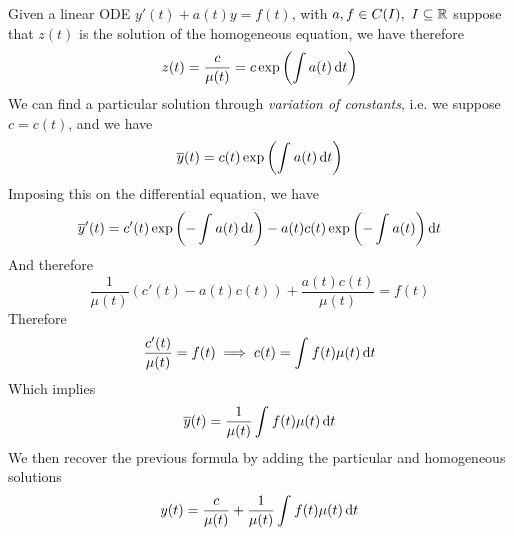 \documentclass[../complete.tex]{subfiles}
\begin{document}
\begin{mtd}
	Given a linear ODE $y'(t)+a(t)y=f(t)$, with $a,f\in C(I),\ I\subseteq\mathbb{R}$ suppose that $z(t)$ is the solution of the homogeneous equation, we have therefore
	\begin{equation*}
		z(t)=\frac{c}{\mu(t)}=c\exp\left( \int a(t)\operatorname{d\!} t \right)
	\end{equation*}
	We can find a particular solution through \textit{variation of constants}, i.e. we suppose $c=c(t)$, and we have
	\begin{equation*}
		\overline{y}(t)=c(t)\exp\left( \int_{}^{}a(t)\operatorname{d\!} t \right)
	\end{equation*}
	Imposing this on the differential equation, we have
	\begin{equation*}
		\overline{y}'(t)=c'(t)\exp\left( -\int_{}^{}a(t)\operatorname{d\!} t \right)-a(t)c(t)\exp\left( -\int_{}^{}a(t) \right)\operatorname{d\!} t
	\end{equation*}
	And therefore
	\begin{equation*}
		\frac{1}{\mu(t)}\left( c'(t)-a(t)c(t) \right)+\frac{a(t)c(t)}{\mu(t)}=f(t)
	\end{equation*}
	Therefore
	\begin{equation*}
		\frac{c'(t)}{\mu(t)}=f(t)\implies{} c(t)=\int_{}^{}f(t)\mu(t)\operatorname{d\!} t
	\end{equation*}
	Which implies
	\begin{equation*}
		\overline{y}(t)=\frac{1}{\mu(t)}\int_{}^{}f(t)\mu(t)\operatorname{d\!} t
	\end{equation*}
	We then recover the previous formula by adding the particular and homogeneous solutions
	\begin{equation*}
		y(t)=\frac{c}{\mu(t)}+\frac{1}{\mu(t)}\int_{}^{}f(t)\mu(t)\operatorname{d\!} t
	\end{equation*}
\end{mtd}
\end{document}
